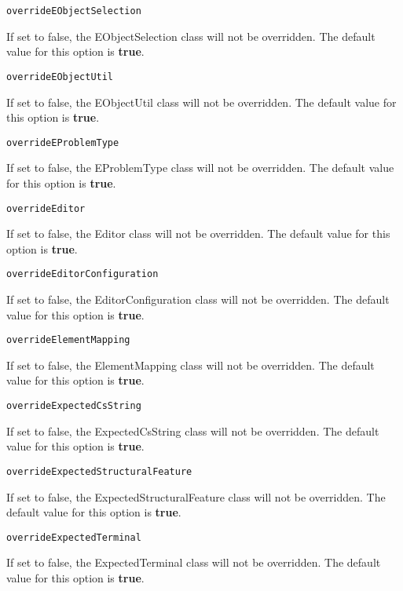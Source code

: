 \noindent\texttt{overrideEObjectSelection}
\begin{myindentpar}{1cm}
If set to false, the EObjectSelection class will not be overridden. The default value for this option is \textbf{true}.
\end{myindentpar}

\noindent\texttt{overrideEObjectUtil}
\begin{myindentpar}{1cm}
If set to false, the EObjectUtil class will not be overridden. The default value for this option is \textbf{true}.
\end{myindentpar}

\noindent\texttt{overrideEProblemType}
\begin{myindentpar}{1cm}
If set to false, the EProblemType class will not be overridden. The default value for this option is \textbf{true}.
\end{myindentpar}

\noindent\texttt{overrideEditor}
\begin{myindentpar}{1cm}
If set to false, the Editor class will not be overridden. The default value for this option is \textbf{true}.
\end{myindentpar}

\noindent\texttt{overrideEditorConfiguration}
\begin{myindentpar}{1cm}
If set to false, the EditorConfiguration class will not be overridden. The default value for this option is \textbf{true}.
\end{myindentpar}

\noindent\texttt{overrideElementMapping}
\begin{myindentpar}{1cm}
If set to false, the ElementMapping class will not be overridden. The default value for this option is \textbf{true}.
\end{myindentpar}

\noindent\texttt{overrideExpectedCsString}
\begin{myindentpar}{1cm}
If set to false, the ExpectedCsString class will not be overridden. The default value for this option is \textbf{true}.
\end{myindentpar}

\noindent\texttt{overrideExpectedStructuralFeature}
\begin{myindentpar}{1cm}
If set to false, the ExpectedStructuralFeature class will not be overridden. The default value for this option is \textbf{true}.
\end{myindentpar}

\noindent\texttt{overrideExpectedTerminal}
\begin{myindentpar}{1cm}
If set to false, the ExpectedTerminal class will not be overridden. The default value for this option is \textbf{true}.
\end{myindentpar}

